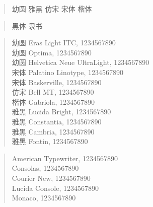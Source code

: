 \documentclass[12pt,a4paper]{article}
\begin{document}
\begin{Large}

\begin{verse}
{\YouYuan 幼圆}
{\YaHei 雅黑}
{\FangSong 仿宋}
{\SimSun 宋体}
{\KaiTi 楷体}
\end{verse}

\begin{verse}
{\HeiTi 黑体}
{\LiShu 隶书}
\end{verse}

\begin{verse}
{\YouYuan 幼圆} {\Eras Eras Light ITC, 1234567890}\\
{\YouYuan 幼圆} {\Optima Optima, 1234567890}\\
{\YouYuan 幼圆} {\HelveticaNeueUL Helvetica Neue UltraLight, 1234567890}\\
{\SimSun 宋体} {\Palatino Palatino Linotype, 1234567890}\\
{\SimSun 宋体} {\Baskerville Baskerville, 1234567890}\\
{\FangSong 仿宋} {\BellMT Bell MT, 1234567890}\\
{\KaiTi 楷体} {\Gabriola Gabriola, 1234567890}\\
{\YaHei 雅黑} {\LucidaBright Lucida Bright, 1234567890}\\
{\YaHei 雅黑} {\Constantia Constantia, 1234567890}\\
{\YaHei 雅黑} {\Cambria Cambria, 1234567890}\\
{\YaHei 雅黑} {\Fontin Fontin, 1234567890}\\
\end{verse}

\begin{verse}
{\Typewriter American Typewriter, 1234567890}\\
{\Consolas Consolas, 1234567890}\\
{\CourierNew Courier New, 1234567890}\\
{\LucidaConsole Lucida Console, 1234567890}\\
{\Monaco Monaco, 1234567890}\\
\end{verse}

\end{Large}
\end{document}
